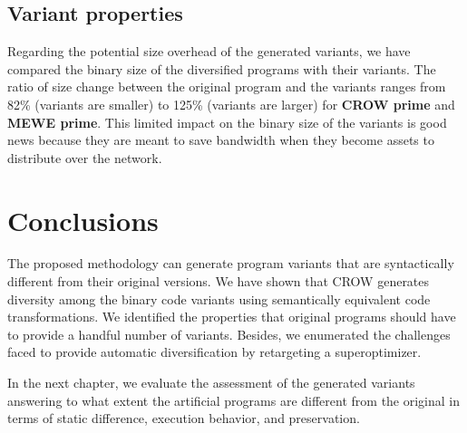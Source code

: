 
%




\subsection{Variant properties}

Regarding the potential size overhead of the generated variants, we have compared the \wasm binary size of the diversified programs with their variants. The ratio of size change between the original program and the variants ranges from 82\% (variants are smaller) to 125\% (variants are larger) for \textbf{CROW prime} and \textbf{MEWE prime}. This limited impact on the binary size of the variants is good news because they are meant to save bandwidth when they become assets to distribute over the network.

\pagebreak
\section{Conclusions}

The proposed methodology can generate program variants that are syntactically different from their original versions. We have shown that CROW generates diversity among the binary code variants using semantically equivalent code transformations. We identified the properties that original programs should have to provide a handful number of variants. Besides, we enumerated the challenges faced to provide automatic diversification by retargeting a superoptimizer.

In the next chapter, we evaluate the assessment of the generated variants answering to what extent the artificial programs are different from the original in terms of static difference, execution behavior, and preservation.

\let\cleardoublepage\clearpage